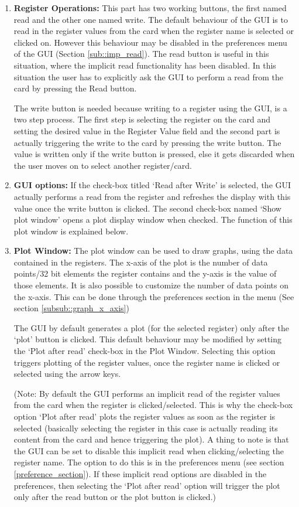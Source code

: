 \begin{enumerate}
\item \textbf{Register Operations:} \label{itm:Register_Operations} This part has two working buttons, the first named read and the other one named write. The default behaviour of the GUI is to read in the register values from the card when the register name is selected or clicked on. However this behaviour may be disabled in the preferences menu of the GUI (Section \ref{sub::imp_read}). The read button is useful in this situation, where the implicit read functionality has been disabled. In this situation the user has to explicitly ask the GUI to perform a read from the card by pressing the Read button.

The write button is needed because writing to a register using the GUI, is a two step process. The first step is selecting the register on the card and setting the desired value in the Register Value field and the second part is actually triggering the write to the card by pressing the write button. The value is written only if the write button is pressed, else it gets discarded when the user moves on to select another register/card. 

\item \textbf{GUI options:} If the check-box titled `Read after Write' is selected, the GUI actually performs a read from the register and refreshes the display with this value once the write button is clicked. The second check-box named `Show plot window' opens a plot display window when checked. The function of this  plot window is explained below.

\item \textbf{Plot Window:} The plot window can be used to draw graphs, using the data contained in the registers. The x-axis of the plot is the number of data points/32 bit elements the register contains and the y-axis is the value of those elements. It is also possible to customize the number of data points on the x-axis. This can be done through the preferences section in the menu (See section \ref{subsub::graph_x_axis})

The GUI by default generates a plot (for the selected register) only after the `plot' button is clicked. This default behaviour may be modified by setting the `Plot after read' check-box in the Plot Window. Selecting this option triggers plotting of the register values, once the register name is clicked or selected using the arrow keys. 
	
(Note: By default the GUI performs an implicit read of the register values from the card when the register is clicked/selected. This is why the check-box option `Plot after read' plots the register values as soon as the register is selected (basically selecting the register in this case is actually reading its content from the card and hence triggering the plot). A thing to note is that the GUI can be set to disable this implicit read when clicking/selecting the register name. The option to do this is in the preferences menu (see section \ref{preference_section}). If these implicit read options are disabled in the preferences, then selecting the `Plot after read' option will trigger the plot only after the read button or the plot button is clicked.)


\end{enumerate}
